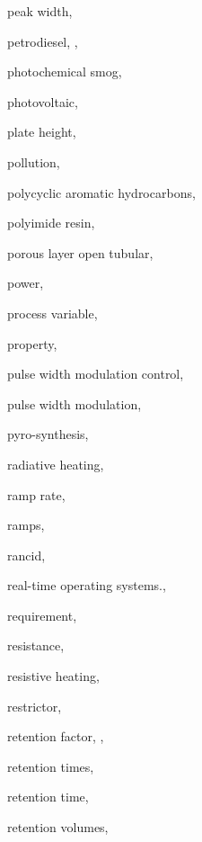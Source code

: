 \begin{theindex}
  \item \lowercase {peak width}, 
  \item \lowercase {petrodiesel}, , 
  \item \lowercase {photochemical smog}, 
  \item \lowercase {photovoltaic}, 
  \item \lowercase {plate height}, 
  \item \lowercase {pollution}, 
  \item \lowercase {polycyclic aromatic hydrocarbons}, 
  \item \lowercase {polyimide resin}, 
  \item \lowercase {porous layer open tubular}, 
  \item \lowercase {power}, 
  \item \lowercase {process variable}, 
  \item \lowercase {property}, 
  \item \lowercase {pulse width modulation control}, 
  \item \lowercase {pulse width modulation}, 
  \item \lowercase {pyro-synthesis}, 
  \item \lowercase {radiative heating}, 
  \item \lowercase {ramp rate}, 
  \item \lowercase {ramps}, 
  \item \lowercase {rancid}, 
  \item \lowercase {real-time operating systems.}, 
  \item \lowercase {requirement}, 
  \item \lowercase {resistance}, 
  \item \lowercase {resistive heating}, 
  \item \lowercase {restrictor}, 
  \item \lowercase {retention factor}, , 
  \item \lowercase {retention times}, 
  \item \lowercase {retention time}, 
  \item \lowercase {retention volumes}, 

\end{theindex}
